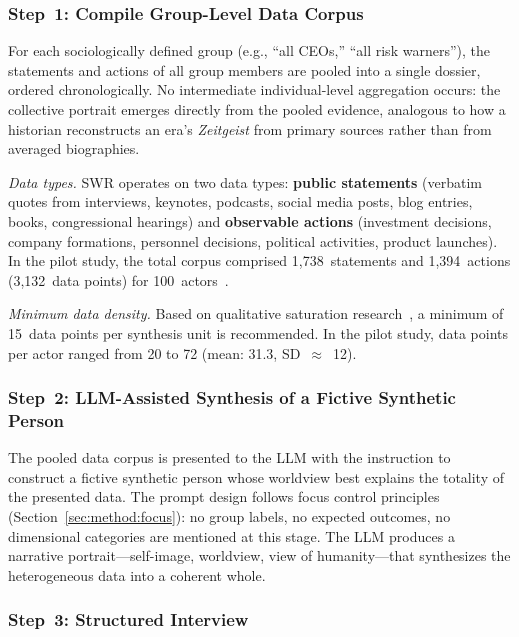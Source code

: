 \documentclass[11pt,a4paper]{article}
\begin{document}
\subsubsection{Step~1: Compile Group-Level Data Corpus}

For each sociologically defined group (e.g., ``all CEOs,'' ``all risk warners''), the statements and actions of all group members are pooled into a single dossier, ordered chronologically. No intermediate individual-level aggregation occurs: the collective portrait emerges directly from the pooled evidence, analogous to how a historian reconstructs an era's \emph{Zeitgeist} from primary sources rather than from averaged biographies.

\emph{Data types.} SWR operates on two data types: \textbf{public statements} (verbatim quotes from interviews, keynotes, podcasts, social media posts, blog entries, books, congressional hearings) and \textbf{observable actions} (investment decisions, company formations, personnel decisions, political activities, product launches). In the pilot study, the total corpus comprised 1,738~statements and 1,394~actions (3,132~data points) for 100~actors~\citep{Geiger2026PaperA}.

\emph{Minimum data density.} Based on qualitative saturation research~\citep{Guest2006, FugardPotts2015}, a minimum of 15~data points per synthesis unit is recommended. In the pilot study, data points per actor ranged from 20 to 72 (mean: 31.3, SD~$\approx$~12).

\subsubsection{Step~2: LLM-Assisted Synthesis of a Fictive Synthetic Person}

The pooled data corpus is presented to the LLM with the instruction to construct a fictive synthetic person whose worldview best explains the totality of the presented data. The prompt design follows focus control principles (Section~\ref{sec:method:focus}): no group labels, no expected outcomes, no dimensional categories are mentioned at this stage. The LLM produces a narrative portrait---self-image, worldview, view of humanity---that synthesizes the heterogeneous data into a coherent whole.

\subsubsection{Step~3: Structured Interview}
\end{document}
